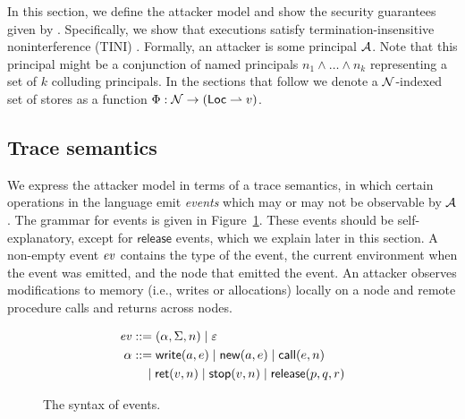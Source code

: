In this section, we define the attacker model and show the security guarantees given by \lang. Specifically, we show that \lang{} executions satisfy termination-insensitive noninterference (TINI) \cite{4223226}. Formally, an attacker is some principal $\mathcal{A}$. Note that this principal might be a conjunction of named principals $n_1 \wedge \dots \wedge n_k$ representing a set of $k$ colluding principals. In the sections that follow we denote a $\mathcal{N}$-indexed set of stores as a function $\Phi: \mathcal{N} \to (\mathsf{Loc} \rightharpoonup v)$.

\subsection{Trace semantics}
We express the attacker model in terms of a trace semantics, in which certain operations in the language emit \emph{events} which may or may not be observable by $\mathcal{A}$. The grammar for events is given in Figure~\ref{fig:event-syntax}. These events should be self-explanatory, except for $\mathsf{release}$ events, which we explain later in this section. A non-empty event $\mathit{ev}$ contains the type of the event, the current environment when the event was emitted, and the node that emitted the event. An attacker observes modifications to memory (i.e., writes or allocations) locally on a node and remote procedure calls and returns across nodes.

\begin{figure}
\centering
\begin{align*}
\mathit{ev} &::= (\alpha, \Sigma, n) \mid \varepsilon\\
\alpha &::= \mathsf{write}(a, e) \mid \mathsf{new}(a, e) \mid \mathsf{call}(e, n) \\ &\quad \mid \mathsf{ret}(v, n) \mid \mathsf{stop}(v, n) \mid \mathsf{release}(p, q, r)
\end{align*}
\caption{The syntax of events.}
\label{fig:event-syntax}
\end{figure}

